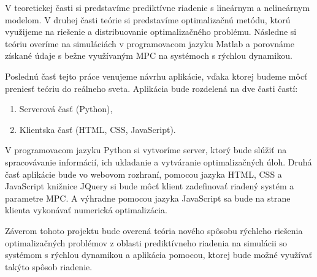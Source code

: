V teoretickej časti si predstavíme prediktívne riadenie s lineárnym a nelineárnym modelom. V druhej časti teórie si predstavíme optimalizačnú metódu, ktorú využijeme na riešenie a distribuovanie optimalizačného problému. Následne si teóriu overíme na simuláciách v programovacom jazyku Matlab a porovnáme získané údaje s bežne využívaným MPC na systémoch s rýchlou dynamikou. 

Poslednú časť tejto práce venujeme návrhu aplikácie, vďaka ktorej budeme môcť preniesť teóriu do reálneho sveta. Aplikácia bude rozdelená na dve časti častí:
\begin{enumerate}
	\item Serverová časť (Python),
	\item Klientska časť (HTML, CSS, JavaScript).
\end{enumerate}
V programovacom jazyku Python si vytvoríme server, ktorý bude slúžiť na spracovávanie informácií, ich ukladanie a vytváranie optimalizačných úloh. Druhá časť aplikácie bude vo webovom rozhraní, pomocou jazyka HTML, CSS a JavaScript knižnice JQuery si bude môcť klient zadefinovať riadený systém a parametre MPC. A výhradne pomocou jazyka JavaScript sa bude na strane klienta vykonávať numerická optimalizácia. 

Záverom tohoto projektu bude overená teória nového spôsobu rýchleho riešenia optimalizačných problémov z oblasti prediktívneho riadenia na simulácii so systémom s rýchlou dynamikou a aplikácia pomocou, ktorej bude možné využívať takýto spôsob riadenie. 
